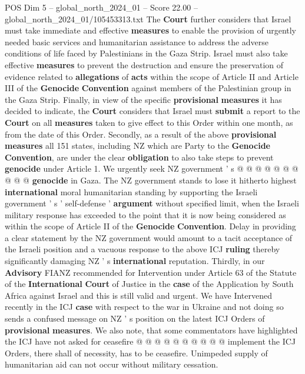\begin{textsample}{POS Dim 5 – global\_north\_2024\_01 – Score 22.00 – global\_north\_2024\_01/105453313.txt}
The \textbf{Court} further considers that Israel must take immediate and effective \textbf{measures} to enable the provision of urgently needed basic services and humanitarian assistance to address the adverse conditions of life faced by Palestinians in the Gaza Strip.
Israel must also take effective \textbf{measures} to prevent the destruction and ensure the preservation of evidence related to \textbf{allegations} of \textbf{acts} within the scope of Article II and Article III of the \textbf{Genocide} \textbf{Convention} against members of the Palestinian group in the Gaza Strip.
Finally, in view of the specific \textbf{provisional} \textbf{measures} it has decided to indicate, the \textbf{Court} considers that Israel must \textbf{submit} a report to the \textbf{Court} on all \textbf{measures} taken to give effect to this Order within one month, as from the date of this Order.
Secondly, as a result of the above \textbf{provisional} \textbf{measures} all 151 states, including NZ which are Party to the \textbf{Genocide} \textbf{Convention}, are under the clear \textbf{obligation} to also take steps to prevent \textbf{genocide} under Article 1.
We urgently seek NZ government ' s @ @ @ @ @ @ @ @ @ @ \textbf{genocide} in Gaza.
The NZ government stands to lose it hitherto highest \textbf{international} moral humanitarian standing by supporting the Israeli government ' s ' self-defense ' \textbf{argument} without specified limit, when the Israeli military response has exceeded to the point that it is now being considered as within the scope of Article II of the \textbf{Genocide} \textbf{Convention}.
Delay in providing a clear statement by the NZ government would amount to a tacit acceptance of the Israeli position and a vacuous response to the above ICJ \textbf{ruling} thereby significantly damaging NZ ' s \textbf{international} reputation.
Thirdly, in our \textbf{Advisory} FIANZ recommended for Intervention under Article 63 of the Statute of the \textbf{International} \textbf{Court} of Justice in the \textbf{case} of the Application by South Africa against Israel and this is still valid and urgent.
We have Intervened recently in the ICJ \textbf{case} with respect to the war in Ukraine and not doing so sends a confused message on NZ ' s position on the latest ICJ Orders of \textbf{provisional} \textbf{measures}.
We also note, that some commentators have highlighted the ICJ have not asked for ceasefire @ @ @ @ @ @ @ @ @ @ implement the ICJ Orders, there shall of necessity, has to be ceasefire.
Unimpeded supply of humanitarian aid can not occur without military cessation.

\end{textsample}
